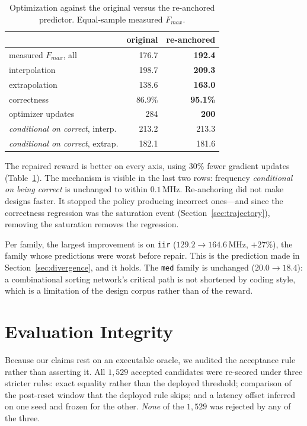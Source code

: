 \documentclass[journal]{IEEEtran}
\newcommand{\fmax}{$F_{\mathit{max}}$}
\begin{document}
\begin{table}[t]
\caption{Optimization against the original versus the re-anchored predictor.
Equal-sample measured \fmax{}.}
\label{tab:v9}
\centering
\small
\begin{tabular}{lrr}
\toprule
 & original & re-anchored \\
\midrule
measured \fmax{}, all      & 176.7 & \textbf{192.4} \\
\quad interpolation        & 198.7 & \textbf{209.3} \\
\quad extrapolation        & 138.6 & \textbf{163.0} \\
correctness                & 86.9\% & \textbf{95.1\%} \\
optimizer updates          & 284   & \textbf{200} \\
\midrule
\emph{conditional on correct}, interp. & 213.2 & 213.3 \\
\emph{conditional on correct}, extrap. & 182.1 & 181.6 \\
\bottomrule
\end{tabular}
\end{table}

The repaired reward is better on every axis, using $30\%$ fewer gradient
updates (Table~\ref{tab:v9}). The mechanism is visible in the last two rows:
frequency \emph{conditional on being correct} is unchanged to within
$0.1$\,MHz. Re-anchoring did not make designs faster. It stopped the policy
producing incorrect ones---and since the correctness regression was the
saturation event (Section~\ref{sec:trajectory}), removing the saturation removes
the regression.

Per family, the largest improvement is on \texttt{iir}
($129.2 \rightarrow 164.6$\,MHz, $+27\%$), the family whose predictions were
worst before repair. This is the prediction made in
Section~\ref{sec:divergence}, and it holds. The \texttt{med} family is unchanged
($20.0 \rightarrow 18.4$): a combinational sorting network's critical path is
not shortened by coding style, which is a limitation of the design corpus rather
than of the reward.

\section{Evaluation Integrity}
\label{sec:integrity}

Because our claims rest on an executable oracle, we audited the acceptance rule
rather than asserting it. All $1{,}529$ accepted candidates were re-scored under
three stricter rules: exact equality rather than the deployed threshold;
comparison of the post-reset window that the deployed rule skips; and a latency
offset inferred on one seed and frozen for the other. \emph{None} of the
$1{,}529$ was rejected by any of the three.
\end{document}
